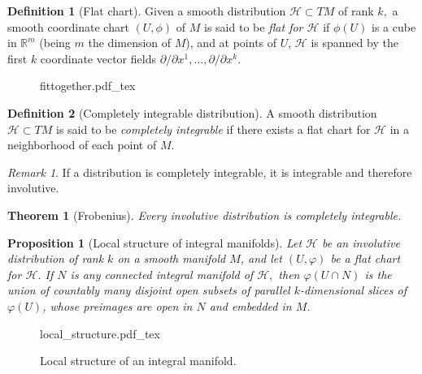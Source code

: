 \documentclass [xcolor=svgnames, t] {beamer}
\newcommand{\incfig}[2][1]{%
    \def\svgwidth{#1\columnwidth}
    {#2.pdf_tex}
}
\theoremstyle{definition}
\newtheorem{df}{Definition}
\theoremstyle{plain}
\newtheorem{prop}{Proposition}
\newtheorem{thm}{Theorem}
\theoremstyle{remark}
\newtheorem{rem}{Remark}
\begin{document}
\begin{frame}[fragile]
	\begin{df}[Flat chart]
	Given a smooth distribution $ \mathcal{H}\subset TM $  of rank $ k, $ a smooth coordinate chart $ (U,\phi) $ of $ M $ is said to be \textit{flat for $ \mathcal{H} $ } if $ \phi(U) $ is a cube in $ \mathbb{R}^m  $ (being $ m $ the dimension of $ M $), and at points of $ U $, $ \mathcal{H} $ is spanned by the first $ k $ coordinate vector fields $ \partial/\partial x^1,\dots,\partial/\partial x^k $.
\end{df}
	
\begin{figure}
    \centering
    \incfig[0.9]{fittogether}
    \label{fig:fittogether}
\end{figure}
\end{frame}

\begin{frame}[fragile]
	\begin{df}[Completely integrable distribution]
	A smooth distribution $ \mathcal{H}\subset TM $  is said to be \textit{completely integrable} if there exists a flat chart for $ \mathcal{H} $ in a neighborhood of each point of $ M. $ 
\end{df}
\begin{rem}
	If a distribution is completely integrable, it is integrable and therefore involutive.
\end{rem}
\begin{thm}[Frobenius]
	Every involutive distribution is completely integrable.	
\end{thm}
\end{frame}
\begin{frame}[fragile]
\begin{prop}[Local structure of integral manifolds]\label{prop:local_structure}
	Let $ \mathcal{H} $ be an involutive distribution of rank $ k $ on a smooth manifold $ M $, and let $ (U,\varphi) $ be a flat chart for $ \mathcal{H} $. If $ N $ is any connected integral manifold of $ \mathcal{H}, $ then $ \varphi(U\cap N) $ is the union of countably many disjoint open subsets of parallel $ k $-dimensional slices of $ \varphi(U) $, whose preimages are open in $ N $ and embedded in $ M $.
\end{prop}
\begin{figure}
    \centering
    \incfig[0.8]{local_structure}
    \caption{Local structure of an integral manifold.}
    \label{fig:local_structure}
\end{figure}
\end{frame}
\end{document}
